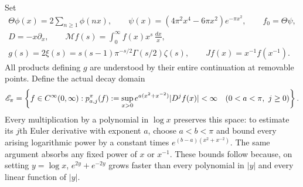 \documentclass[11pt]{article}
\newcommand{\Mell}{\mathcal M}\newcommand{\Sch}{\mathcal S}
\begin{document}
Set
\begin{equation}\label{eq:objects}
\begin{gathered}
\Theta\phi(x)=2\sum_{n\geq1}\phi(nx),\qquad
\psi(x)=(4\pi^2x^4-6\pi x^2)e^{-\pi x^2},\qquad f_0=\Theta\psi,\\
D=-x\partial_x,\qquad
\Mell f(s)=\int_0^\infty f(x)x^s\,\frac{dx}{x},\\
g(s)=2\xi(s)=s(s-1)\pi^{-s/2}\Gamma(s/2)\zeta(s),\qquad
Jf(x)=x^{-1}f(x^{-1}).
\end{gathered}
\end{equation}
All products defining $g$ are understood by their entire continuation
at removable points. Define the actual decay domain
\begin{equation}\label{eq:Epi}
\mathscr E_\pi=\left\{f\in C^\infty(0,\infty):
p_{a,j}^{\pi}(f):=\sup_{x>0}e^{a(x^2+x^{-2})}|D^jf(x)|<\infty
\quad(0<a<\pi,\ j\geq0)\right\}.
\end{equation}
Every multiplication by a polynomial in $\log x$ preserves this
space: to estimate its $j$th Euler derivative with exponent $a$, choose
$a<b<\pi$ and bound every arising logarithmic power by a constant
times $e^{(b-a)(x^2+x^{-2})}$. The same argument absorbs any fixed
power of $x$ or $x^{-1}$. These bounds follow because, on setting
$y=\log x$, $e^{2y}+e^{-2y}$ grows faster than every polynomial in
$|y|$ and every linear function of $|y|$.
\end{document}
